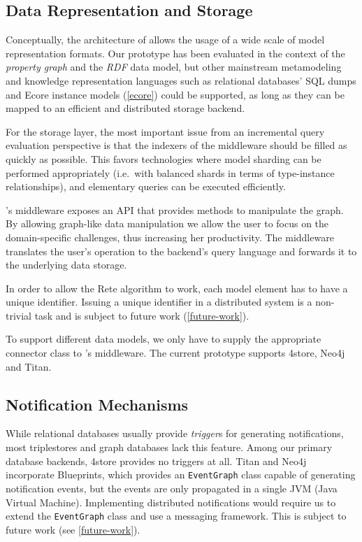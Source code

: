\subsection{Data Representation and Storage}
\label{storage}

Conceptually, the architecture of \iqd{} allows the usage of a wide scale of model representation formats. Our prototype has been evaluated in the context of the \emph{property graph} and the \emph{RDF} data model, but other mainstream metamodeling and knowledge representation languages such as relational databases' SQL dumps and Ecore instance models (\autoref{ecore}) could be supported, as long as they can be mapped to an efficient and distributed storage backend.

For the storage layer, the most important issue from an incremental query evaluation perspective is that the indexers of the middleware should be filled as quickly as possible. This favors technologies where model sharding can be performed appropriately (i.e.\ with balanced shards in terms of type-instance relationships), and elementary queries can be executed efficiently.

\iqd{}'s middleware exposes an API that provides methods to manipulate the graph. By allowing graph-like data manipulation we allow the user to focus on the domain-specific challenges, thus increasing her productivity. The middleware translates the user's operation to the backend's query language and forwards it to the underlying data storage.

In order to allow the Rete algorithm to work, each model element has to have a unique identifier. Issuing a unique identifier in a distributed system is a non-trivial task and is subject to future work (\autoref{future-work}).

To support different data models, we only have to supply the appropriate connector class to \iqd{}'s middleware. The current prototype supports 4store, Neo4j and Titan.

\subsection{Notification Mechanisms}

While relational databases usually provide \emph{trigger}s for generating notifications, most triplestores and graph databases lack this feature. Among our primary database backends, 4store provides no triggers at all. Titan and Neo4j incorporate Blueprints, which provides an \texttt{EventGraph} class capable of generating notification events, but the events are only propagated in a single JVM (Java Virtual Machine). Implementing distributed notifications would require us to extend the \texttt{EventGraph} class and use a messaging framework. This is subject to future work (see \autoref{future-work}).

